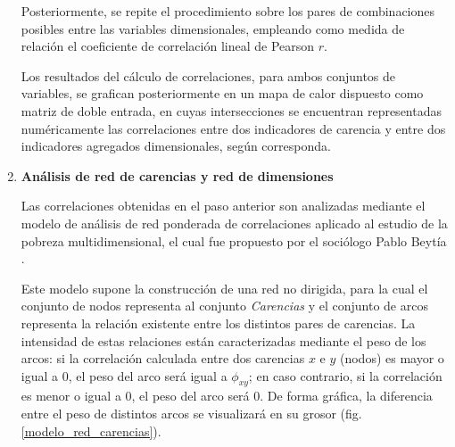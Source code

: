 \documentclass[12pt,letterpaper,spanish]{article}
\begin{document}
\begin{enumerate}
Posteriormente, se repite el procedimiento sobre los pares de combinaciones posibles entre las variables dimensionales, empleando como medida de relación el coeficiente de correlación lineal de Pearson $r$. 

Los resultados del cálculo de correlaciones, para ambos conjuntos de variables, se grafican posteriormente en un mapa de calor dispuesto como matriz de doble entrada, en cuyas intersecciones se encuentran representadas numéricamente las correlaciones entre dos indicadores de carencia y entre dos indicadores agregados dimensionales, según corresponda.

\vspace{2em}

\item \textbf{Análisis de red de carencias y red de dimensiones}

Las correlaciones obtenidas en el paso anterior son analizadas mediante el modelo de análisis de red ponderada de correlaciones aplicado al estudio de la pobreza multidimensional, el cual fue propuesto por el sociólogo Pablo Beytía \cite{Beytia2016PobrezaChile}. 

Este modelo supone la construcción de una red no dirigida, para la cual el conjunto de nodos representa al conjunto \textit{Carencias} y el conjunto de arcos representa la relación existente entre los distintos pares de carencias. La intensidad de estas relaciones están caracterizadas mediante el peso de los arcos: si la correlación calculada entre dos carencias $x$ e $y$ (nodos) es mayor o igual a $0$, el peso del arco será igual a $\phi_{xy}$; en caso contrario, si la correlación es menor o igual a $0$, el peso del arco será $0$. De forma gráfica, la diferencia entre el peso de distintos arcos se visualizará en su grosor (fig. \ref{modelo_red_carencias}).




\end{enumerate}
\end{document}
